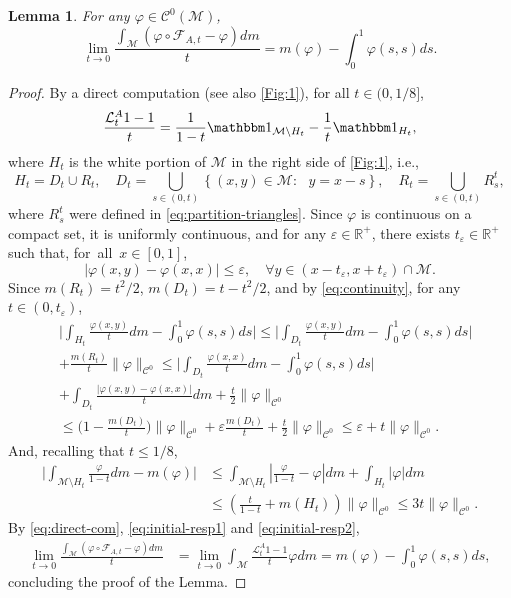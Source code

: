 \documentclass{amsart}
\numberwithin{equation}{section}
\newtheorem{lemma}[theorem]{Lemma}
\newcommand\ve{\varepsilon}
\newcommand\vf{\varphi}
\renewcommand{\le}{\leqslant}
\newcommand\cC{{\mathcal C}}
\newcommand\cF{{\mathcal F}}
\newcommand\cL{{\mathcal L}}
\newcommand\cM{{\mathcal M}}
\newcommand\bR{{\mathbb R}}
\newcommand{\catt}{\cF_{A,t}}
\begin{document}
\begin{lemma}\label{lem:formula-lin-resp} 
For any \(\vf \in \cC^0(\cM)\),
  \[
       \lim_{t \to 0} \frac{\int_{\cM}(\vf \circ \catt - \vf)dm}{t} =   m (\vf)-\int_{0}^1 \vf(s,s)ds.
  \]
\end{lemma}
\begin{proof}
By a direct computation (see also \ref{Fig:1}), for all \(t \in (0, 1/8]\),
\begin{equation}\label{eq:direct-com}
    \frac{\cL^A_{t}1 - 1}{t} = \frac{1}{1-t} \mathbbm 1_{\cM \setminus H_t} - \frac{1}{t}\mathbbm 1_{H_t} ,
\end{equation}
where \(H_t\) is the white portion of \(\cM\) in the right side of \ref{Fig:1}, i.e.,
\[
H_t = D_t \cup R_t, \quad D_t =  \bigcup_{s \in (0,t)} \left\{(x,y) \in \cM : \text{ }y = x - s\right\}, \quad R_t = \bigcup_{s \in (0,t)} R^t_s,
\]
where \(R_s^t\) were defined in \eqref{eq:partition-triangles}. Since \(\vf\) is continuous on a compact set, it is uniformly continuous, and for any \(\ve \!\in \!\bR^+\), there exists \(t_{\ve} \!\in \!\bR^+\) such that, \mbox{for all \(x \!\in \![0,1]\),}
\begin{equation}\label{eq:continuity}
    |\vf(x,y) - \vf(x,x)| \le \ve, \quad \forall y \in (x-t_{\ve}, x + t_{\ve}) \cap \cM.
\end{equation}
Since \(m \left(R_t\right) = t^2 /2\), \(m(D_t) = t - t^2/2\), and by \eqref{eq:continuity}, for any \(t \in (0, t_{\ve})\),
\begin{equation}\label{eq:initial-resp1}
\begin{split}
     &\biggl|\int_{H_t} \frac{\vf(x,y)}{t} dm - \int_0^1\vf(s,s)ds\biggr|\le \biggl|\int_{D_t} \frac{\vf(x,y)}{t} dm - \int_0^1 \vf(s,s)ds\biggr|\\
&+ \frac{m(R_t)}{t}\|\vf\|_{\cC^0} \le \biggl|\int_{D_t}\frac{\vf(x,x)}{t}dm - \int_0^1 \vf(s,s)ds \biggr|\\
&+ \int_{D_t}\frac{|\vf(x,y) - \vf(x,x)|}{t}dm + \frac{t}{2}\|\vf\|_{\cC^0}  \\
&\le \biggl(1 - \frac{m(D_t)}{t}\biggr)\|\vf\|_{\cC^0}+ \ve\frac{m(D_t)}{t} + \frac{t}{2} \|\vf\|_{\cC^0} \le \ve + t\|\vf\|_{\cC^0}.
\end{split}
\end{equation}
And, recalling that \(t \le 1/8\),
\begin{equation}\label{eq:initial-resp2}
\begin{split}
\biggl|\int_{\cM \setminus H_t} \frac{\vf}{1-t} dm - m(\vf)\biggr|&\le  \int_{\cM \setminus H_t}\left|\frac{\vf}{1-t} - \vf \right|dm +  \int_{H_t} |\vf| dm \\
& \le  \left(\frac{t}{1-t} + m\left(H_t\right)\right)\|\vf\|_{\cC^0}\le 3 t \|\vf\|_{\cC^0}.
\end{split}
\end{equation}
By \eqref{eq:direct-com}, \eqref{eq:initial-resp1} and \eqref{eq:initial-resp2},
\[
\begin{split}
   \lim_{t \to 0} \frac{\int_{\cM}(\vf \circ \catt - \vf)dm}{t} &= \lim_{t \to 0} \int_{\cM} \frac{\cL_{t}^A 1 - 1}{t}\vf dm = m (\vf)-\int_{0}^1 \vf(s,s)ds,
\end{split}
\]
concluding the proof of the Lemma.
\end{proof}
\end{document}
